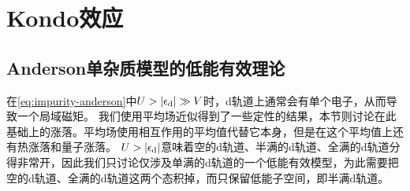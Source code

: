 \section{Kondo效应}\label{sec:kondo-effect}

\subsection{Anderson单杂质模型的低能有效理论}

在\eqref{eq:impurity-anderson}中$U > \abs{\epsilon_\text{d}} \gg V$时，d轨道上通常会有单个电子，从而导致一个局域磁矩。
我们使用平均场近似得到了一些定性的结果，本节则讨论在此基础上的涨落。平均场使用相互作用的平均值代替它本身，但是在这个平均值上还有热涨落和量子涨落。
$U > \abs{\epsilon_\text{d}}$意味着空的d轨道、半满的d轨道、全满的d轨道分得非常开，因此我们只讨论仅涉及单满的d轨道的一个低能有效模型，为此需要把空的d轨道、全满的d轨道这两个态积掉，而只保留低能子空间，即半满d轨道。

